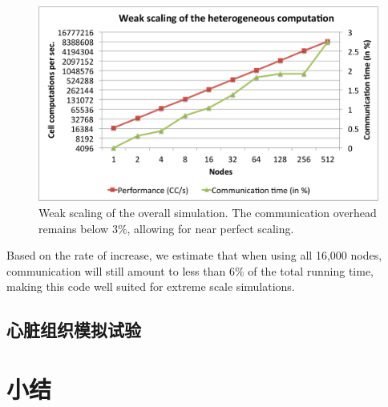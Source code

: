 \begin{figure}
 \includegraphics[width=\linewidth]{figs/weakscaling.pdf}
  \caption{Weak scaling of the overall simulation. The communication overhead remains below $3\%$, allowing for near perfect scaling.}
  \label{weak_scale}
\end{figure}

Based on the rate of increase, we estimate that when using all 16,000 nodes, communication will still amount to less than $6\%$ of the total running time, making this code well suited for extreme scale simulations.

\subsection{心脏组织模拟试验}

\section{小结}
